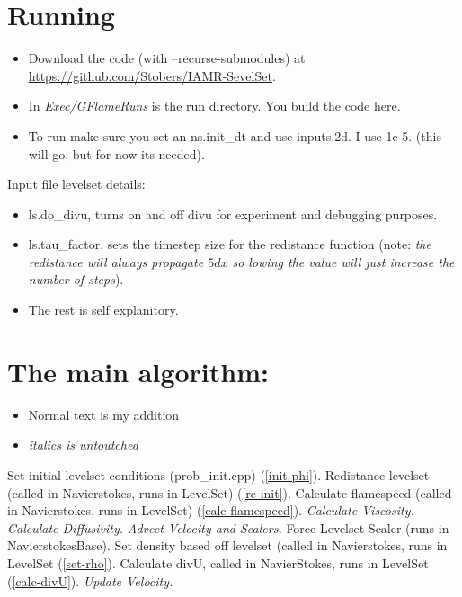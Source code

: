 \documentclass[12pt]{report}
\begin{document}
\section*{Running}

\begin{itemize}
\item Download the code (with --recurse-submodules) at {\url{https://github.com/Stobers/IAMR-SevelSet}}.
\item In \textit{Exec/GFlameRuns} is the run directory. You build the code here.
\item To run make sure you set an ns.init\_dt and use inputs.2d. I use 1e-5. (this will go, but for now its needed).
\end{itemize}

Input file levelset details:
\begin{itemize}
\item ls.do\_divu, turns on and off divu for experiment and debugging purposes.
\item ls.tau\_factor, sets the timestep size for the redistance function (note: \textit{the redistance will always propagate $5dx$ so lowing the value will just increase the number of steps}).
\item The rest is self explanitory.
\end{itemize}





\section*{The main algorithm:}

\begin{itemize}
\item Normal text is my addition
\item \textit{italics is untoutched}
\end{itemize}

\begin{algorithm}
\begin{algorithmic}[1]
  \State Set initial levelset conditions (prob\_init.cpp) (\ref{init-phi}).
  \State Redistance levelset (called in Navierstokes, runs in LevelSet) (\ref{re-init}).
  \State Calculate flamespeed (called in Navierstokes, runs in LevelSet) (\ref{calc-flamespeed}).
  \State \textit{Calculate Viscosity.}
  \State \textit{Calculate Diffusivity.}
  \State \textit{Advect Velocity and Scalers.}
  \State Force Levelset Scaler (runs in NavierstokesBase).
  \State Set density based off levelset (called in  Navierstokes, runs in LevelSet (\ref{set-rho}).
  \State Calculate divU, called in NavierStokes, runs in LevelSet (\ref{calc-divU}).
  \State \textit{Update Velocity.}
\end{algorithmic}
\end{algorithm}
\end{document}
